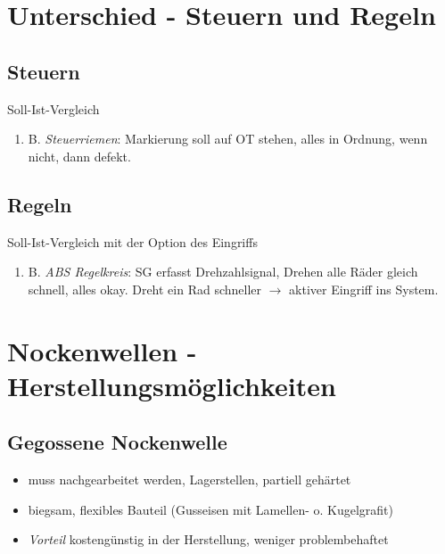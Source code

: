 \section{Unterschied - Steuern und
Regeln}\label{unterschied-steuern-und-regeln}

\subsection{Steuern}\label{steuern}

Soll-Ist-Vergleich

\begin{enumerate}
\def\labelenumi{\alph{enumi}.}
\setcounter{enumi}{25}
\item
  B. \emph{Steuerriemen}: Markierung soll auf OT stehen, alles in
  Ordnung, wenn nicht, dann defekt.
\end{enumerate}

\subsection{Regeln}\label{regeln}

Soll-Ist-Vergleich mit der Option des Eingriffs

\begin{enumerate}
\def\labelenumi{\alph{enumi}.}
\setcounter{enumi}{25}
\item
  B. \emph{ABS Regelkreis}: SG erfasst Drehzahlsignal, Drehen alle Räder
  gleich schnell, alles okay. Dreht ein Rad schneller $\to$ aktiver
  Eingriff ins System.
\end{enumerate}

\section{Nockenwellen -
Herstellungsmöglichkeiten}\label{nockenwellen-herstellungsmoeglichkeiten}

\subsection{Gegossene Nockenwelle}\label{gegossene-nockenwelle}

\begin{itemize}
\item
  muss nachgearbeitet werden, Lagerstellen, partiell gehärtet
\item
  biegsam, flexibles Bauteil (Gusseisen mit Lamellen- o. Kugelgrafit)
\item
  \emph{Vorteil} kostengünstig in der Herstellung, weniger
  problembehaftet
\end{itemize}

